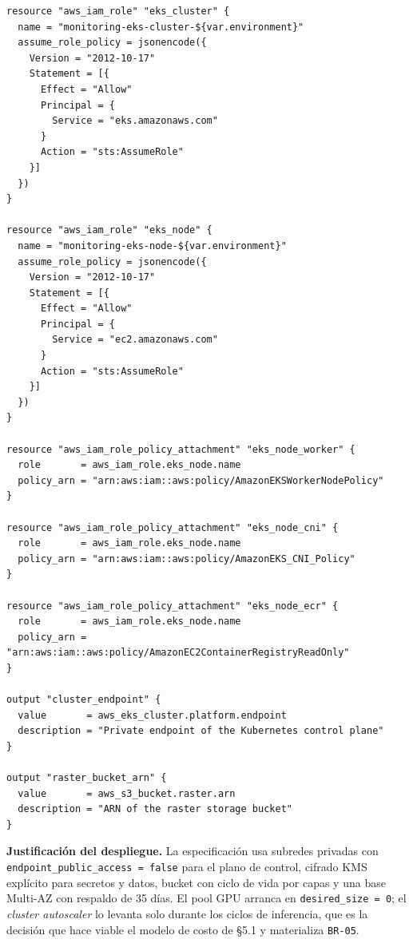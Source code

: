 \documentclass{article}
\begin{document}
\begin{lstlisting}
resource "aws_iam_role" "eks_cluster" {
  name = "monitoring-eks-cluster-${var.environment}"
  assume_role_policy = jsonencode({
    Version = "2012-10-17"
    Statement = [{
      Effect = "Allow"
      Principal = {
        Service = "eks.amazonaws.com"
      }
      Action = "sts:AssumeRole"
    }]
  })
}

resource "aws_iam_role" "eks_node" {
  name = "monitoring-eks-node-${var.environment}"
  assume_role_policy = jsonencode({
    Version = "2012-10-17"
    Statement = [{
      Effect = "Allow"
      Principal = {
        Service = "ec2.amazonaws.com"
      }
      Action = "sts:AssumeRole"
    }]
  })
}

resource "aws_iam_role_policy_attachment" "eks_node_worker" {
  role       = aws_iam_role.eks_node.name
  policy_arn = "arn:aws:iam::aws:policy/AmazonEKSWorkerNodePolicy"
}

resource "aws_iam_role_policy_attachment" "eks_node_cni" {
  role       = aws_iam_role.eks_node.name
  policy_arn = "arn:aws:iam::aws:policy/AmazonEKS_CNI_Policy"
}

resource "aws_iam_role_policy_attachment" "eks_node_ecr" {
  role       = aws_iam_role.eks_node.name
  policy_arn = "arn:aws:iam::aws:policy/AmazonEC2ContainerRegistryReadOnly"
}

output "cluster_endpoint" {
  value       = aws_eks_cluster.platform.endpoint
  description = "Private endpoint of the Kubernetes control plane"
}

output "raster_bucket_arn" {
  value       = aws_s3_bucket.raster.arn
  description = "ARN of the raster storage bucket"
}
\end{lstlisting}

\textbf{Justificación del despliegue.} La especificación usa subredes privadas con \texttt{endpoint\_\allowbreak{}public\_\allowbreak{}access =\allowbreak{} false} para el plano de control, cifrado KMS explícito para secretos y datos, bucket con ciclo de vida por capas y una base Multi-AZ con respaldo de 35 días. El pool GPU arranca en \texttt{desired\_\allowbreak{}size =\allowbreak{} 0}; el \emph{cluster autoscaler} lo levanta solo durante los ciclos de inferencia, que es la decisión que hace viable el modelo de costo de \S{}5.1 y materializa \texttt{BR-\allowbreak{}05}.
\end{document}
